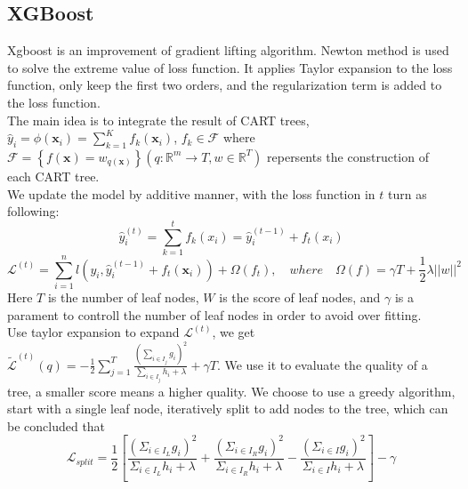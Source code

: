 \documentclass{article}
\begin{document}
\subsection{XGBoost}

Xgboost is an improvement of gradient lifting algorithm. Newton method is used to solve the extreme value of loss function. It applies Taylor expansion to the loss function, only keep the first two orders, and the regularization term is added to the loss function.\\
The main idea is to  integrate the result of CART trees, $\hat{y}_{i}=\phi\left(\mathbf{x}_{i}\right)=\sum_{k=1}^{K} f_{k}\left(\mathbf{x}_{i}\right)$, $f_{k} \in \mathcal{F}$ where  $\mathcal{F}=\left\{f(\mathbf{x})=w_{q(\mathbf{x})}\right\}\left(q: \mathbb{R}^{m} \rightarrow T, w \in \mathbb{R}^{T}\right)$ repersents the construction of each CART tree. \\
We update the model by additive manner, with the loss function in $t$ turn as following: $$\hat{y}_{i}^{(t)}=\sum_{k=1}^{t} f_{k}\left(x_{i}\right)=\hat{y}_{i}^{(t-1)}+f_{t}\left(x_{i}\right)$$ $$\mathcal{L}^{(t)}=\sum_{i=1}^{n} l\left(y_{i}, \hat{y}_{i}^{(t-1)}+f_{t}\left(\mathbf{x}_{i}\right)\right)+\Omega\left(f_{t}\right), \quad where \quad  \Omega(f) = \gamma T + \frac{1}{2}\lambda \left|\left|w\right|\right| ^2$$ Here $T$ is the number of leaf nodes, $W$ is the score of leaf nodes, and $\gamma$ is a parament to controll the number of leaf nodes in order to  avoid over fitting. \\
Use taylor expansion to expand $\mathcal{L}^{(t)}$, we get $\tilde{\mathcal{L}}^{(t)}(q)=-\frac{1}{2} \sum_{j=1}^{T} \frac{\left(\sum_{i \in I_{j}} g_{i}\right)^{2}}{\sum_{i \in I_{j}} h_{i}+\lambda}+\gamma T$. We use it to evaluate the quality of a tree, a smaller score means a higher quality. We choose to use a greedy algorithm, start with a single leaf node, iteratively split to add nodes to the tree, which can be concluded that $$\mathcal{L}_{split} = \frac{1}{2} \left[ \frac{\left( \Sigma_{i \in I_{L}} g_i\right) ^2}{\Sigma_{i \in I_{L}} h_i+\lambda} + \frac{\left( \Sigma_{i \in I_{R}} g_i\right) ^2}{\Sigma_{i \in I_{R}} h_i+\lambda} - \frac{\left( \Sigma_{i \in I} g_i\right) ^2}{\Sigma_{i \in I} h_i+\lambda} \right] - \gamma  $$
\end{document}
